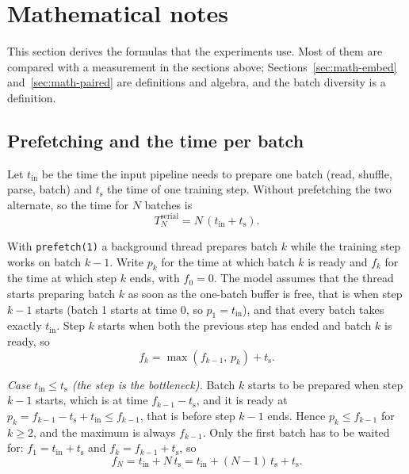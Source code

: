 \section{Mathematical notes}
\label{sec:math}

This section derives the formulas that the experiments use. Most of them are compared with a measurement in the sections above; Sections~\ref{sec:math-embed} and~\ref{sec:math-paired} are definitions and algebra, and the batch diversity is a definition.

\subsection{Prefetching and the time per batch}

Let $t_{\mathrm{in}}$ be the time the input pipeline needs to prepare one batch (read, shuffle, parse, batch) and $t_{\mathrm{s}}$ the time of one training step. Without prefetching the two alternate, so the time for $N$ batches is
\begin{equation}
T_N^{\mathrm{serial}} = N\,(t_{\mathrm{in}} + t_{\mathrm{s}}) .
\end{equation}

With \texttt{prefetch(1)} a background thread prepares batch $k$ while the training step works on batch $k-1$. Write $p_k$ for the time at which batch $k$ is ready and $f_k$ for the time at which step $k$ ends, with $f_0 = 0$. The model assumes that the thread starts preparing batch $k$ as soon as the one-batch buffer is free, that is when step $k-1$ starts (batch 1 starts at time 0, so $p_1 = t_{\mathrm{in}}$), and that every batch takes exactly $t_{\mathrm{in}}$. Step $k$ starts when both the previous step has ended and batch $k$ is ready, so
\begin{equation}
f_k = \max(f_{k-1},\, p_k) + t_{\mathrm{s}} .
\end{equation}

\emph{Case $t_{\mathrm{in}} \le t_{\mathrm{s}}$ (the step is the bottleneck).} Batch $k$ starts to be prepared when step $k-1$ starts, which is at time $f_{k-1} - t_{\mathrm{s}}$, and it is ready at $p_k = f_{k-1} - t_{\mathrm{s}} + t_{\mathrm{in}} \le f_{k-1}$, that is before step $k-1$ ends. Hence $p_k \le f_{k-1}$ for $k \ge 2$, and the maximum is always $f_{k-1}$. Only the first batch has to be waited for: $f_1 = t_{\mathrm{in}} + t_{\mathrm{s}}$ and $f_k = f_{k-1} + t_{\mathrm{s}}$, so
\begin{equation}
f_N = t_{\mathrm{in}} + N\,t_{\mathrm{s}} = t_{\mathrm{in}} + (N-1)\,t_{\mathrm{s}} + t_{\mathrm{s}} .
\end{equation}

